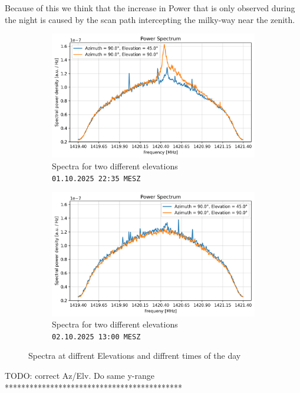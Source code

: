 Because of this we think that the increase in Power that is only observed during the night is caused by the scan path intercepting the milky-way near the zenith.
\begin{figure}[ht]
\centering
\begin{subfigure}[t]{0.45\textwidth}
    \centering
    \includegraphics[width=\linewidth]{assets/elev_spectrum_night.png}
    \caption{Spectra for two different elevations\\ \texttt{01.10.2025 22:35 MESZ}}
\end{subfigure}
\begin{subfigure}[t]{0.45\textwidth}
    \centering
    \includegraphics[width=\linewidth]{assets/elev_spectrum_day.png}
    \caption{Spectra for two different elevations\\ \texttt{02.10.2025 13:00 MESZ}}
\end{subfigure}
\caption{Spectra at diffrent Elevations and diffrent times of the day}
\label{fig:elev_spectra}
\end{figure}


TODO: correct Az/Elv. Do same y-range *******************************************